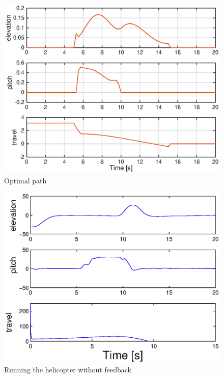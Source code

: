 \begin{figure}[H]
	\centering
	\includegraphics[width=\textwidth]{day4_calc_outputs}
	\caption{Optimal path}
	\label{fig:estimatedDay201}
\end{figure}

\begin{figure}[H]
	\centering
	\includegraphics[width=\textwidth]{day4_nofeed}
	\caption{Running the helicopter without feedback}
	\label{fig:day4nofeed}
\end{figure}



